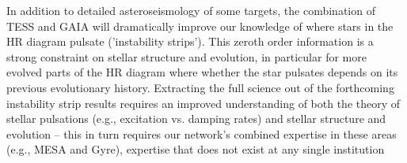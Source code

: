 In addition to detailed asteroseismology of some targets, the combination of TESS and GAIA will dramatically improve our knowledge of where stars in the HR diagram pulsate ('instability strips').   This zeroth order information is  a strong constraint on stellar structure and evolution, in particular for more evolved parts of the HR diagram where whether the star pulsates depends on its previous evolutionary history.  Extracting the full science out of the forthcoming instability strip results requires an improved understanding of both the theory of stellar pulsations (e.g., excitation vs. damping rates) and stellar structure and evolution -- this in turn requires our network's combined expertise in these areas (e.g., MESA and Gyre), expertise that does not exist at any single institution

